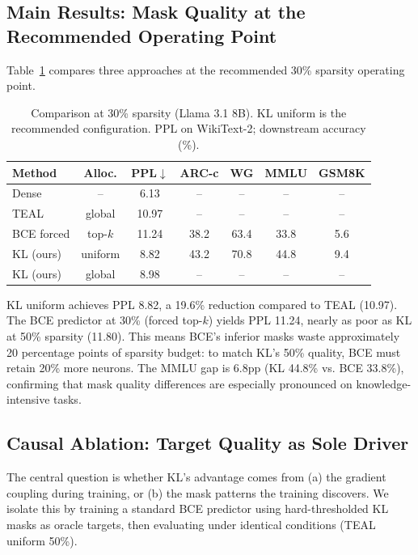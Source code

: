 \documentclass[11pt,a4paper]{article}
\begin{document}
\subsection{Main Results: Mask Quality at the Recommended Operating Point}

Table~\ref{tab:main30} compares three approaches at the recommended 30\% sparsity operating point.

\begin{table}[h]
\centering
\small
\caption{Comparison at 30\% sparsity (Llama 3.1 8B). KL uniform is the recommended configuration. PPL on WikiText-2; downstream accuracy (\%).}
\label{tab:main30}
\begin{tabular}{lcccccc}
\toprule
\textbf{Method} & \textbf{Alloc.} & \textbf{PPL}$\downarrow$ & \textbf{ARC-c} & \textbf{WG} & \textbf{MMLU} & \textbf{GSM8K} \\
\midrule
Dense & -- & 6.13 & -- & -- & -- & -- \\
TEAL & global & 10.97 & -- & -- & -- & -- \\
BCE forced & top-$k$ & 11.24 & 38.2 & 63.4 & 33.8 & 5.6 \\
KL (ours) & uniform & 8.82 & 43.2 & 70.8 & 44.8 & 9.4 \\
KL (ours) & global & 8.98 & -- & -- & -- & -- \\
\bottomrule
\end{tabular}
\end{table}

KL uniform achieves PPL 8.82, a 19.6\% reduction compared to TEAL (10.97).
The BCE predictor at 30\% (forced top-$k$) yields PPL 11.24, nearly as poor as KL at 50\% sparsity (11.80).
This means BCE's inferior masks waste approximately 20 percentage points of sparsity budget: to match KL's 50\% quality, BCE must retain 20\% more neurons.
The MMLU gap is 6.8pp (KL 44.8\% vs. BCE 33.8\%), confirming that mask quality differences are especially pronounced on knowledge-intensive tasks.

\subsection{Causal Ablation: Target Quality as Sole Driver}
\label{sec:ablation}

The central question is whether KL's advantage comes from (a) the gradient coupling during training, or (b) the mask patterns the training discovers.
We isolate this by training a standard BCE predictor using hard-thresholded KL masks as oracle targets, then evaluating under identical conditions (TEAL uniform 50\%).
\end{document}

